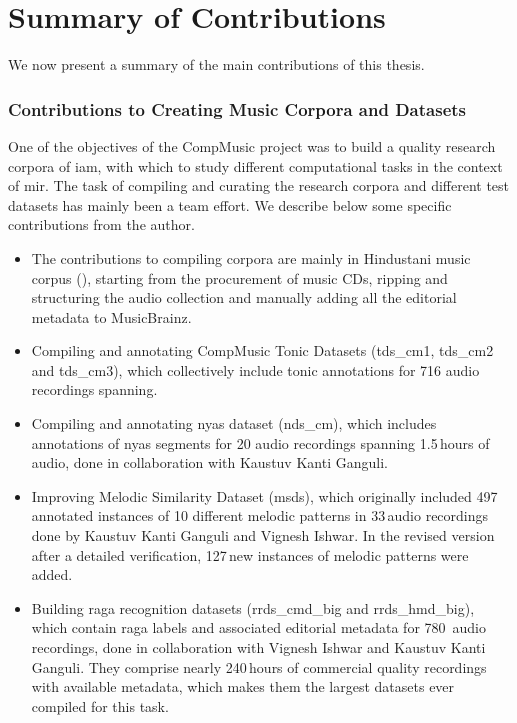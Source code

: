  
\section{Summary of Contributions}
\label{sec:summary_contributions}
We now present a summary of the main contributions of this thesis.

\subsubsection*{Contributions to Creating Music Corpora and Datasets}

One of the objectives of the CompMusic project was to build a quality research corpora of \gls{iam}, with which to study different computational tasks in the context of \gls{mir}. The task of compiling and curating the research corpora and different test datasets has mainly been a team effort. We describe below some specific contributions from the author. 

\begin{itemize}
	
	\item The contributions to compiling corpora are mainly in Hindustani music corpus (), starting from the procurement of music CDs, ripping and structuring the audio collection and manually adding all the editorial metadata to MusicBrainz. 
	
	\item Compiling and annotating CompMusic Tonic Datasets (\acrshort{tds_cm1}, \acrshort{tds_cm2} and \acrshort{tds_cm3}), which collectively include tonic annotations for 716 audio recordings spanning. 
	
	\item Compiling and annotating \Gls{nyas} dataset (\acrshort{nds_cm}), which includes annotations of \gls{nyas} segments for 20 audio recordings spanning 1.5\,hours of audio, done in collaboration with Kaustuv Kanti Ganguli. 
	
	\item Improving Melodic Similarity Dataset (\acrshort{msds}), which originally included 497 annotated instances of 10 different melodic patterns in 33\,audio recordings done by Kaustuv Kanti Ganguli and Vignesh Ishwar. In the revised version after a detailed verification, 127\,new instances of melodic patterns were added.
	 
	\item Building \Gls{raga} recognition datasets (\acrshort{rrds_cmd_big} and \acrshort{rrds_hmd_big}), which contain \gls{raga} labels and associated editorial metadata for 780\, audio recordings, done in collaboration with Vignesh Ishwar and Kaustuv Kanti Ganguli. They comprise nearly 240\,hours of commercial quality recordings with available metadata, which makes them the largest datasets ever compiled for this task.
\end{itemize}

